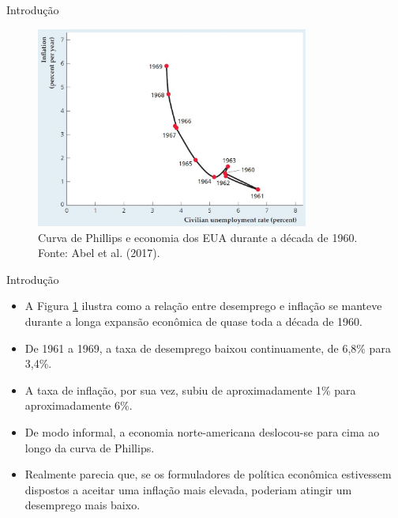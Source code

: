 \documentclass[10pt]{beamer}
\begin{document}
\begin{frame}{Introdução}
    \begin{figure}
        \centering
        \includegraphics[width=0.8\textwidth]{./figures/aula10_fig9.JPG}
        \caption{Curva de Phillips e economia dos EUA durante a década de 1960. Fonte: Abel et al. (2017).}
        \label{fig8}
    \end{figure}
\end{frame}

\begin{frame}{Introdução}
    \begin{itemize}
        \item A Figura \ref{fig8} ilustra como a relação entre desemprego e inflação se manteve durante a longa expansão econômica de quase toda a década de 1960.
        \bigskip
        \item De 1961 a 1969, a taxa de desemprego baixou continuamente, de 6,8\% para 3,4\%.
        \bigskip
        \item A taxa de inflação, por sua vez, subiu de aproximadamente 1\% para aproximadamente 6\%.
        \bigskip
        \item De modo informal, a economia norte-americana deslocou-se para cima ao longo da curva de Phillips.
        \bigskip
        \item Realmente parecia que, se os formuladores de política econômica estivessem dispostos a aceitar uma inflação mais elevada, poderiam atingir um desemprego mais baixo.
    \end{itemize}
\end{frame}
\end{document}
